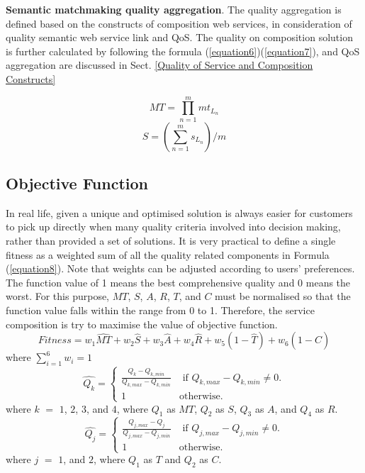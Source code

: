 \documentclass{IEEEtran}
\begin{document}
\textbf{Semantic matchmaking quality aggregation}. The quality aggregation is defined based on the constructs of composition web services, in consideration of quality semantic web service link and QoS. The quality on composition solution is further calculated by following the formula (\ref{equation6})(\ref{equation7}), and QoS aggregation are discussed in Sect. \ref{Quality of Service and Composition Constructs}

\begin{equation}
\label{equation6}
MT {=} \prod_{n=1}^{m} mt_ {L_{n}}
\end{equation}
\begin{equation}
\label{equation7}
S {=} (\sum_{n=1}^m s_ {L_{n}})/m
\end{equation}


\subsection{Objective Function}
In real life, given a unique and optimised solution is always easier for customers to pick up directly when many quality criteria involved into decision making, rather than provided a set of solutions. It is very practical to define a single fitness as a weighted sum of all the quality related components in Formula (\ref{equation8}). Note that weights can be adjusted according to users' preferences. The function value of 1 means the best comprehensive quality and 0 means the worst. For this purpose, $MT$, $S$, $A$, $R$, $T$, and $C$ must be normalised so that the function value falls within the range from 0 to 1. Therefore, the service composition is try to maximise the value of objective function.
\vspace{-0.2cm}
\begin{equation}
\label{equation8}
Fitness = w_1 \hat{MT} + w_2 \hat{S} + w_3 \hat{A} + w_4 \hat{R} + w_5(1 - \hat{T}) + w_6(1 - \hat{C})
\end{equation}
\noindent where $\sum_{i=1}^{6} w_i = 1$
\\
\vspace{-0.2cm}
\begin{equation}
\label{equation9}
\hat{Q_k} = 
\begin{cases}
	\frac{Q_k - Q_{k, min}}{Q_{k, max} - Q_{k, min}} & \text{ if }Q_{k, max} - Q_{k, min} \neq 0.\\
	1 & \mathrm{ otherwise}.
\end{cases}
\end{equation}
\noindent where $k$ $=$ $1$, $2$, $3$, and $4$, where $Q_1$ as $MT$, $Q_2$ as $S$, $Q_3$ as $A$, and $Q_4$ as $R$.
\begin{equation}
\label{equation10}
\hat{Q_j} = 
\begin{cases}
	\frac{Q_{j,max} - Q_j}{Q_{j, max} - Q_{j, min}} & \text{ if }Q_{j, max} - Q_{j, min} \neq 0.\\
	1 & \mathrm{ otherwise}.
\end{cases}
\end{equation}
\noindent where $j$ $=$ $1$, and $2$, where $Q_1$ as $T$ and $Q_2$ as $C$.
\end{document}
